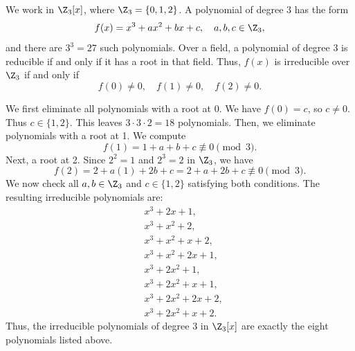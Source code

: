 \begin{solution}
  We work in $\Z_3[x]$, where $\Z_3 = \{0, 1, 2\}$. A polynomial of degree $3$ has the form
  \[%
    f(x) = x^3 + ax^2 + bx + c, \quad a,b,c \in \Z_3
  ,\]%
  and there are $3^3 = 27$ such polynomials. Over a field, a polynomial of degree $3$ is reducible if and only if it has a root in that field. Thus, $f(x)$ is irreducible over $\Z_3$ if and only if
  \[%
    f(0) \neq 0, \quad f(1) \neq 0, \quad f(2) \neq 0
  .\]%

  We first eliminate all polynomials with a root at 0. We have $f(0) = c$, so $c \neq 0$. Thus $c \in \{1,2\}$. This leaves $3 \cdot 3 \cdot 2 = 18$ polynomials. Then, we eliminate polynomials with a root at 1. We compute
  \[%
    f(1) = 1 + a + b + c \not\equiv 0 \pmod{3}
  .\]%
  Next, a root at 2. Since $2^2 = 1$ and $2^3 = 2$ in $\Z_3$, we have
  \[%
    f(2) = 2 + a(1) + 2b + c = 2 + a + 2b + c \not\equiv 0 \pmod{3}
  .\]%
  We now check all $a, b \in \Z_3$ and $c \in \{1, 2\}$ satisfying both conditions. The resulting irreducible polynomials are:
  \begin{align*}
    &x^3 + 2x + 1, \\
    &x^3 + x^2 + 2, \\
    &x^3 + x^2 + x + 2, \\
    &x^3 + x^2 + 2x + 1, \\
    &x^3 + 2x^2 + 1, \\
    &x^3 + 2x^2 + x + 1, \\
    &x^3 + 2x^2 + 2x + 2, \\
    &x^3 + 2x^2 + x + 2
  .\end{align*}
  Thus, the irreducible polynomials of degree $3$ in $\Z_3[x]$ are exactly the eight polynomials listed above.
\end{solution}
